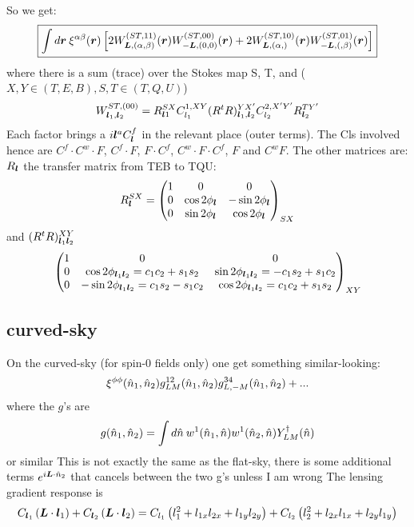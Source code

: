 \documentclass[11pt]{article}
\begin{document}
So we get:
\begin{equation}\boxed{
 \int d\boldsymbol{r} \:	\xi^{\alpha \beta}(\boldsymbol{r}) \left[2W^{(ST, 11)}_{\boldsymbol{L}, (\alpha, \beta)}(\boldsymbol{r})W^{(ST, 00)}_{-\boldsymbol{L},(0,0)}(\boldsymbol{r}) + 2 W^{(ST, 10)}_{\boldsymbol{L}, (\alpha,)}(\boldsymbol{r})W^{(ST, 01)}_{-\boldsymbol{L},(,\beta)}(\boldsymbol{r})\right]}
\end{equation}
where there is a sum (trace) over the Stokes map S, T, and ($X, Y \in (T, E ,B), S, T \in (T, Q, U)$)
\begin{equation}
	W^{ST, (00)}_{\boldsymbol{l}_1,\boldsymbol{l}_2} = R^{SX}_{\boldsymbol{l}1} C^{1, XY}_{l_1} (R^tR)^{YX'}_{\boldsymbol{l}_1,\boldsymbol{l}_2} C_{l_2}^{2, X' Y'} R^{T Y'}_{\boldsymbol{l}_2}
\end{equation}
Each factor brings a $i\boldsymbol{l}^a C^{f}_{\boldsymbol{l}}$ in the relevant place (outer terms). The Cls involved hence are $C^f \cdot C^w  \cdot F$, $C^f \cdot F$, $F \cdot C^f$, $ C^w \cdot F \cdot C^f$, $F$ and $C^w F$.
The other matrices are: $R_{\boldsymbol{l}}$ the transfer matrix from TEB to TQU:
\begin{equation} R^{SX}_{\boldsymbol{l}} = 
	\begin{pmatrix}
		1 & 0 & 0 \\ 0 & \cos 2\phi_{\boldsymbol{l}} & -\sin 2\phi_{\boldsymbol{l}} \\ 0 & \sin 2\phi_{\boldsymbol{l}} & \cos 2\phi_{\boldsymbol{l}}
	\end{pmatrix}_{SX}
\end{equation}
and $(R^tR)^{XY}_{\boldsymbol{l}_1\boldsymbol{l}_2}$
\begin{equation}
		\begin{pmatrix}
		1 & 0 & 0 \\ 0 & \cos 2\phi_{\boldsymbol{l}_1\boldsymbol{l}_2}= c_1c_2 + s_1 s_2 & \sin 2\phi_{\boldsymbol{l}_1\boldsymbol{l}_2}= -c_1s_2 + s_1 c_2 \\ 0 & -\sin 2\phi_{\boldsymbol{l}_1\boldsymbol{l}_2}= c_1s_2 - s_1 c_2 & \cos 2\phi_{\boldsymbol{l}_1\boldsymbol{l}_2}= c_1c_2 + s_1 s_2
	\end{pmatrix}_{XY}
\end{equation}

\subsection{curved-sky}
On the curved-sky (for spin-0 fields only) one get something similar-looking:
\begin{equation}
\xi^{\phi\phi}({\hat n}_1,{\hat n}_2) g^{12}_{LM}({\hat n}_1,{\hat n}_2) g^{34}_{L,-M}({\hat n}_1,{\hat n}_2) + ...
\end{equation}
where the $g$'s are
\begin{equation}
	g({\hat n}_1, {\hat n}_2) = \int d{\hat n} \:w^1({\hat n}_1, {\hat n})w^1({\hat n}_2, {\hat n}) Y^\dagger_{LM}({\hat n})
\end{equation}
or similar
\color{red} This is not exactly the same as the flat-sky, there is some additional terms $e^{i \boldsymbol{L} \cdot {\hat n}_2}$ that cancels between the two g's unless I am wrong
\color{black}
The lensing gradient response is
\begin{equation}
	C_{\boldsymbol{l}_1} \left( \boldsymbol{L} \cdot \boldsymbol{l}_1 \right) + C_{\boldsymbol{l}_2} \left( \boldsymbol{L} \cdot \boldsymbol{l}_2 \right) = C_{l_1}\left( l_1^2  + l_{1x} l_{2x} + l_{1y} l_{2y}\right) + C_{l_2}\left( l_2^2  + l_{2x} l_{1x} + l_{2y} l_{1y}\right)
\end{equation}
\end{document}
